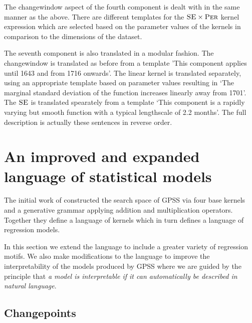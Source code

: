 \documentclass{article}
\begin{document}
The changewindow aspect of the fourth component is dealt with in the same manner as the above.
There are different templates for the ${\textsc{SE}} \times {\textsc{Per}}$ kernel expression which are selected based on the parameter values of the kernels in comparison to the dimensions of the dataset.

The seventh component is also translated in a modular fashion.
The changewindow is translated as before from a template 'This component
applies until 1643 and from 1716 onwards'.
The linear kernel is translated separately, using an appropriate template based on parameter values resulting in `The marginal standard deviation of the function increases linearly away from 1701'.
The ${\textsc{SE}}$ is translated spearately from a template `This component is a rapidly varying but smooth function with a typical lengthscale of 2.2 months'.
The full description is actually these sentences in reverse order.





\section{An improved and expanded language of statistical models}
\label{sec:improvements}
The initial work of \cite{DuvLloGroetal13} constructed the search space of GPSS via four base kernels and a generative grammar applying addition and multiplication operators.
Together they define a language of kernels which in turn defines a language of regression models.

In this section we extend the language to include a greater variety of regression motifs.
We also make modifications to the language to improve the interpretability of the models produced by GPSS where we are guided by the principle that \emph{a model is interpretable if it can automatically be described in natural language}.

\subsection{Changepoints}
\end{document}
